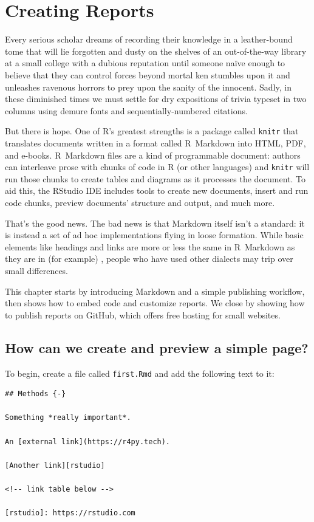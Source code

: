 \chapter{Creating Reports}\label{rmarkdown}

Every serious scholar dreams of recording their knowledge in a leather-bound tome
that will lie forgotten and dusty on the shelves of an out-of-the-way library
at a small college with a dubious reputation
until someone naïve enough to believe that they can control forces beyond mortal ken
stumbles upon it and unleashes ravenous horrors to prey upon the sanity of the innocent.
Sadly,
in these diminished times we must settle for dry expositions of trivia
typeset in two columns using demure fonts and sequentially-numbered citations.

But there is hope.
One of R's greatest strengths is a package called \texttt{knitr}
that translates documents written in a format called R~Markdown into HTML, PDF, and e-books.
R~Markdown files are a kind of programmable document:
authors can interleave prose with chunks of code in R (or other languages)
and \texttt{knitr} will run those chunks to create tables and diagrams
as it processes the document.
To aid this,
the RStudio IDE includes tools to create new documents,
insert and run code chunks,
preview documents' structure and output,
and much more.

That's the good news.
The bad news is that Markdown itself isn't a standard:
it is instead a set of ad hoc implementations flying in loose formation.
While basic elements like headings and links are more or less the same in R~Markdown
as they are in (for example) ,
people who have used other dialects may trip over small differences.

This chapter starts by introducing Markdown and a simple publishing workflow,
then shows how to embed code and customize reports.
We close by showing how to publish reports on GitHub,
which offers free hosting for small websites.

\section{How can we create and preview a simple page?}

To begin,
create a file called \texttt{first.Rmd} and add the following text to it:

\begin{lstlisting}
## Methods {-}

Something *really important*.

An [external link](https://r4py.tech).

[Another link][rstudio]

<!-- link table below -->

[rstudio]: https://rstudio.com
\end{lstlisting}

